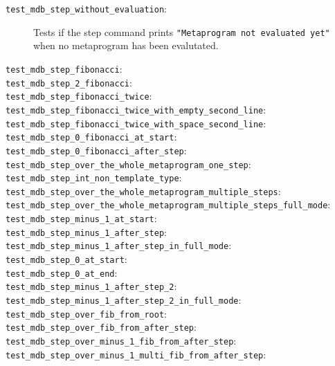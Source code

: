 \begin{description}
    \item[\texttt{test\_mdb\_step\_without\_evaluation}:]
        Tests if the step command prints
        \texttt{"Metaprogram not evaluated yet"} when no metaprogram has been
        evalutated.
    \item[\texttt{test\_mdb\_step\_fibonacci}:]
    \item[\texttt{test\_mdb\_step\_2\_fibonacci}:]
    \item[\texttt{test\_mdb\_step\_fibonacci\_twice}:]
    \item[\texttt{test\_mdb\_step\_fibonacci\_twice\_with\_empty\_second\_line}:]
    \item[\texttt{test\_mdb\_step\_fibonacci\_twice\_with\_space\_second\_line}:]
    \item[\texttt{test\_mdb\_step\_0\_fibonacci\_at\_start}:]
    \item[\texttt{test\_mdb\_step\_0\_fibonacci\_after\_step}:]
    \item[\texttt{test\_mdb\_step\_over\_the\_whole\_metaprogram\_one\_step}:]
    \item[\texttt{test\_mdb\_step\_int\_non\_template\_type}:]
    \item[\texttt{test\_mdb\_step\_over\_the\_whole\_metaprogram\_multiple\_steps}:]
    \item[\texttt{test\_mdb\_step\_over\_the\_whole\_metaprogram\_multiple\_steps\_full\_mode}:]
    \item[\texttt{test\_mdb\_step\_minus\_1\_at\_start}:]
    \item[\texttt{test\_mdb\_step\_minus\_1\_after\_step}:]
    \item[\texttt{test\_mdb\_step\_minus\_1\_after\_step\_in\_full\_mode}:]
    \item[\texttt{test\_mdb\_step\_0\_at\_start}:]
    \item[\texttt{test\_mdb\_step\_0\_at\_end}:]
    \item[\texttt{test\_mdb\_step\_minus\_1\_after\_step\_2}:]
    \item[\texttt{test\_mdb\_step\_minus\_1\_after\_step\_2\_in\_full\_mode}:]
    \item[\texttt{test\_mdb\_step\_over\_fib\_from\_root}:]
    \item[\texttt{test\_mdb\_step\_over\_fib\_from\_after\_step}:]
    \item[\texttt{test\_mdb\_step\_over\_minus\_1\_fib\_from\_after\_step}:]
    \item[\texttt{test\_mdb\_step\_over\_minus\_1\_multi\_fib\_from\_after\_step}:]

\end{description}
